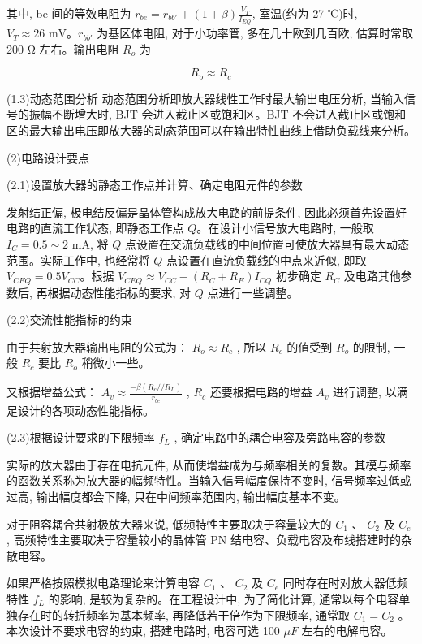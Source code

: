 \documentclass[10pt, a4paper]{article} %
\begin{document}
其中, be 间的等效电阻为 $r_{be} = r_{bb'} + (1 + \beta) \frac{V_T}{I_{EQ}}$, 室温(约为 27 ℃)时, $V_T \approx 26 \text{ mV}$。$r_{bb'}$ 为基区体电阻, 对于小功率管, 多在几十欧到几百欧, 估算时常取 200 Ω 左右。输出电阻 $R_o$ 为

$$
R_o \approx R_c
$$ 

(1.3)动态范围分析
动态范围分析即放大器线性工作时最大输出电压分析, 当输入信号的振幅不断增大时, BJT 会进入截止区或饱和区。BJT 不会进入截止区或饱和区的最大输出电压即放大器的动态范围可以在输出特性曲线上借助负载线来分析。

(2)电路设计要点

(2.1)设置放大器的静态工作点并计算、确定电阻元件的参数

发射结正偏, 极电结反偏是晶体管构成放大电路的前提条件, 因此必须首先设置好电路的直流工作状态, 即静态工作点 $Q$。在设计小信号放大电路时, 一般取 $I_C = 0.5 \sim 2 \text{ mA}$, 将 $Q$ 点设置在交流负载线的中间位置可使放大器具有最大动态范围。实际工作中, 也经常将 $Q$ 点设置在直流负载线的中点来近似, 即取 $V_{CEQ} = 0.5 V_{CC}$。根据 $V_{CEQ} \approx V_{CC} - (R_C + R_E) I_{CQ}$ 初步确定 $R_C$ 及电路其他参数后, 再根据动态性能指标的要求, 对 $Q$ 点进行一些调整。


(2.2)交流性能指标的约束

由于共射放大器输出电阻的公式为： $ R_o \approx R_c $ , 所以  $ R_c $  的值受到  $ R_o $  的限制, 一般  $ R_c $  要比  $ R_o $  稍微小一些。

又根据增益公式： $ A_v \approx \frac{-\beta (R_c // R_L)}{r_{be}} $ ,  $ R_c $  还要根据电路的增益  $ A_v $  进行调整, 以满足设计的各项动态性能指标。

(2.3)根据设计要求的下限频率  $ f_L $ , 确定电路中的耦合电容及旁路电容的参数

实际的放大器由于存在电抗元件, 从而使增益成为与频率相关的复数。其模与频率的函数关系称为放大器的幅频特性。当输入信号幅度保持不变时, 信号频率过低或过高, 输出幅度都会下降, 只在中间频率范围内, 输出幅度基本不变。

对于阻容耦合共射极放大器来说, 低频特性主要取决于容量较大的  $ C_1 $ 、 $ C_2 $  及  $ C_e $ , 高频特性主要取决于容量较小的晶体管 PN 结电容、负载电容及布线搭建时的杂散电容。

如果严格按照模拟电路理论来计算电容  $ C_1 $ 、 $ C_2 $  及  $ C_e $  同时存在时对放大器低频特性  $ f_L $  的影响, 是较为复杂的。在工程设计中, 为了简化计算, 通常以每个电容单独存在时的转折频率为基本频率, 再降低若干倍作为下限频率, 通常取  $ C_1 = C_2 $ 。本次设计不要求电容的约束, 搭建电路时, 电容可选 100  $\mu F$  左右的电解电容。
\end{document}
